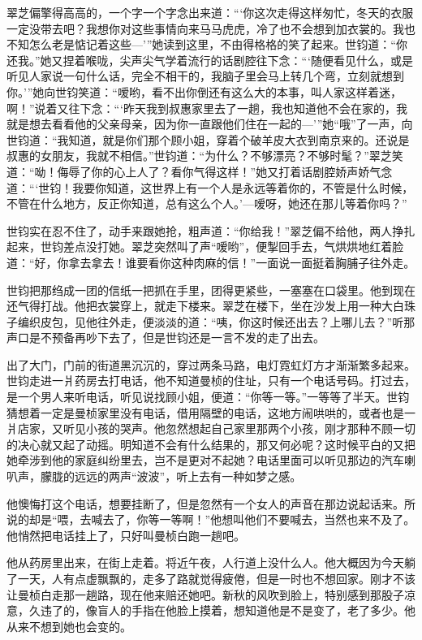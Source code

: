 \par 翠芝偏擎得高高的，一个字一个字念出来道：“‘你这次走得这样匆忙，冬天的衣服一定没带去吧？我想你对这些事情向来马马虎虎，冷了也不会想到加衣裳的。我也不知怎么老是惦记着这些—’”她读到这里，不由得格格的笑了起来。世钧道：“你还我。”她又捏着喉咙，尖声尖气学着流行的话剧腔往下念：“‘随便看见什么，或是听见人家说一句什么话，完全不相干的，我脑子里会马上转几个弯，立刻就想到你。’”她向世钧笑道：“嗳哟，看不出你倒还有这么大的本事，叫人家这样着迷，啊！”说着又往下念：“‘昨天我到叔惠家里去了一趟，我也知道他不会在家的，我就是想去看看他的父亲母亲，因为你一直跟他们住在一起的—’”她“哦”了一声，向世钧道：“我知道，就是你们那个顾小姐，穿着个破羊皮大衣到南京来的。还说是叔惠的女朋友，我就不相信。”世钧道：“为什么？不够漂亮？不够时髦？”翠芝笑道：“呦！侮辱了你的心上人了？看你气得这样！”她又打着话剧腔娇声娇气念道：“‘世钧！我要你知道，这世界上有一个人是永远等着你的，不管是什么时候，不管在什么地方，反正你知道，总有这么个人。’—嗳呀，她还在那儿等着你吗？”
\par 世钧实在忍不住了，动手来跟她抢，粗声道：“你给我！”翠芝偏不给他，两人挣扎起来，世钧差点没打她。翠芝突然叫了声“嗳哟”，便掣回手去，气烘烘地红着脸道：“好，你拿去拿去！谁要看你这种肉麻的信！”一面说一面挺着胸脯子往外走。
\par 世钧把那绉成一团的信纸一把抓在手里，团得更紧些，一塞塞在口袋里。他到现在还气得打战。他把衣裳穿上，就走下楼来。翠芝在楼下，坐在沙发上用一种大白珠子编织皮包，见他往外走，便淡淡的道：“咦，你这时候还出去？上哪儿去？”听那声口是不预备再吵下去了，但是世钧还是一言不发的走了出去。
\par 出了大门，门前的街道黑沉沉的，穿过两条马路，电灯霓虹灯方才渐渐繁多起来。世钧走进一爿药房去打电话，他不知道曼桢的住址，只有一个电话号码。打过去，是一个男人来听电话，听见说找顾小姐，便道：“你等一等。”一等等了半天。世钧猜想着一定是曼桢家里没有电话，借用隔壁的电话，这地方闹哄哄的，或者也是一爿店家，又听见小孩的哭声。他忽然想起自己家里那两个小孩，刚才那种不顾一切的决心就又起了动摇。明知道不会有什么结果的，那又何必呢？这时候平白的又把她牵涉到他的家庭纠纷里去，岂不是更对不起她？电话里面可以听见那边的汽车喇叭声，朦胧的远远的两声“波波”，听上去有一种如梦之感。
\par 他懊悔打这个电话，想要挂断了，但是忽然有一个女人的声音在那边说起话来。所说的却是“喂，去喊去了，你等一等啊！”他想叫他们不要喊去，当然也来不及了。他悄然把电话挂上了，只好叫曼桢白跑一趟吧。
\par 他从药房里出来，在街上走着。将近午夜，人行道上没什么人。他大概因为今天躺了一天，人有点虚飘飘的，走多了路就觉得疲倦，但是一时也不想回家。刚才不该让曼桢白走那一趟路，现在他来赔还她吧。新秋的风吹到脸上，特别感到那股子凉意，久违了的，像盲人的手指在他脸上摸着，想知道他是不是变了，老了多少。他从来不想到她也会变的。
